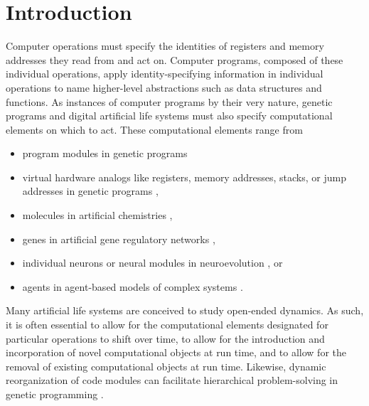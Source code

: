 \section{Introduction}

Computer operations must specify the identities of registers and memory addresses they read from and act on.
Computer programs, composed of these individual operations, apply identity-specifying information in individual operations to name higher-level abstractions such as data structures and functions.
As instances of computer programs by their very nature, genetic programs and digital artificial life systems must also specify computational elements on which to act.
These computational elements range from
\begin{itemize}
  \item program modules in genetic programs \citep{spector2011tag}
  \item virtual hardware analogs like registers, memory addresses, stacks, or jump addresses in genetic programs \citep{lalejini_tag-accessed_2019,ray1991approach,ofria2004avida},
  \item molecules in artificial chemistries \citep{bagley1990spontaneous},
  \item genes in artificial gene regulatory networks \citep{banzhaf2003artificial},
  \item individual neurons or neural modules in neuroevolution \citep{reisinger2007acquiring}, or 
  \item agents in agent-based models of complex systems \citep{riolo2001evolution}.
\end{itemize}

Many artificial life systems are conceived to study open-ended dynamics.
As such, it is often essential to allow for the computational elements designated for particular operations to shift over time, to allow for the introduction and incorporation of novel computational objects at run time, and to allow for the removal of existing computational objects at run time.
Likewise, dynamic reorganization of code modules can facilitate hierarchical problem-solving in genetic programming \citep{Kinnear:Koza:1994:adf}.

